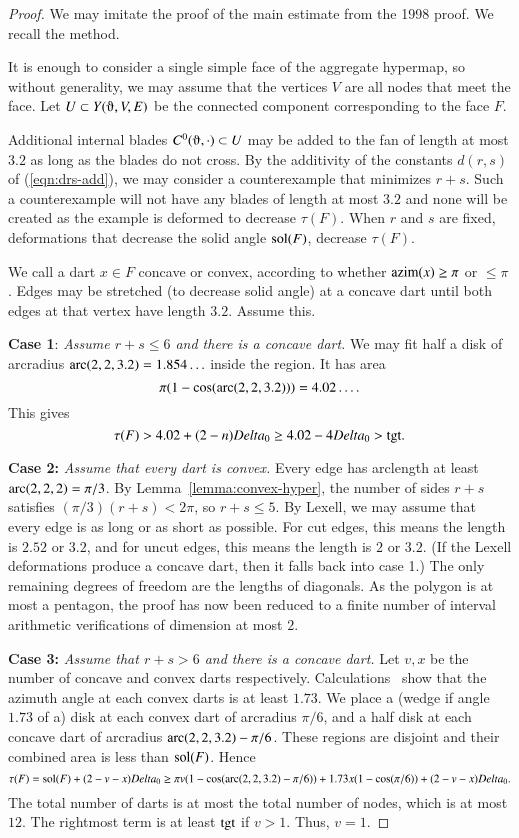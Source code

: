 \begin{proof} We may imitate the proof of the main estimate from the 1998 proof.  We recall the method.

It is enough to consider a single simple face of the aggregate hypermap, so without generality, we may assume that the vertices $V$ are all nodes that meet the face.  Let $U\subset Y(\orgn,V,E)$ be the connected component corresponding to the face $F$.

Additional internal blades $C^0(\orgn,\cdot)\subset U$ may be added to the fan of length at most $3.2$ as long as the blades do not cross.  By the additivity of the constants $d(r,s)$ of (\ref{eqn:drs-add}), we may consider a counterexample that minimizes $r+s$.  Such a counterexample will not have any blades of length at most $3.2$ and none will be created as the example is deformed to decrease $\tau(F)$.  When $r$ and $s$ are fixed, deformations that decrease the solid angle $\operatorname{sol}(F)$, decrease $\tau(F)$.

We call a dart $x\in F$ concave or convex, according to whether ${\operatorname{azim}}(x)\ge\pi$ or $\le\pi$.  Edges may be stretched (to decrease solid angle) at a concave dart until both edges at that vertex have length $3.2$. Assume this.

{\bf Case 1}:
{\it Assume $r+s\le6$ and there is a concave dart.}  We may fit half a disk of arcradius $\operatorname{arc}(2,2,3.2)=1.854\ldots$ inside the region.  It has area
$$\pi(1-\cos(\operatorname{arc}(2,2,3.2)))=4.02\ldots.$$
This gives
$$\tau(F) > 4.02 + (2-n)Delta_0 \ge 4.02 -4 Delta_0 > {\operatorname{tgt}}.$$

{\bf Case 2:}
{\it Assume that every dart is convex.}
Every edge has arclength at least $\operatorname{arc}(2,2,2)=\pi/3$.  By Lemma~\ref{lemma:convex-hyper}, the number of sides $r+s$ satisfies $(\pi/3)(r+s) < 2\pi$, so $r+s\le5$.  By Lexell, we may assume that every edge is as long or as short as possible.  For cut edges, this means the length is $2.52$ or $3.2$, and for uncut edges, this means the length is $2$ or $3.2$.  (If the Lexell deformations produce a concave dart, then it falls back into case 1.)  The only remaining degrees of freedom are the lengths of diagonals.  As the polygon is at most a pentagon, the proof has now been reduced to a finite number of interval arithmetic verifications of dimension at most $2$.

{\bf Case 3:}
{\it Assume that $r+s>6$ and there is a concave dart.}  Let $v,x$ be the number of concave and convex darts respectively.  Calculations~\cite[cc:lft]{hales:2009:nonlinear} show that the azimuth angle at each convex darts is at least $1.73$.  We place a (wedge if angle $1.73$ of a) disk at each convex dart of arcradius $\pi/6$, and a half disk at each concave dart of arcradius $\operatorname{arc}(2,2,3.2)-\pi/6$.  These regions are disjoint and their combined area is less than $\operatorname{sol}(F)$.  Hence
$$
\tau(F)=\operatorname{sol}(F)+(2-v-x)Delta_0 \ge \pi v (1-\cos(\operatorname{arc}(2,2,3.2)-\pi/6)) + 1.73 x (1-\cos(\pi/6)) + (2-v-x)Delta_0.
$$
The total number of darts is at most the total number of nodes, which is at most $12$.  The rightmost term is at least ${\operatorname{tgt}}$ if $v> 1$. Thus, $v=1$.


\end{proof}
